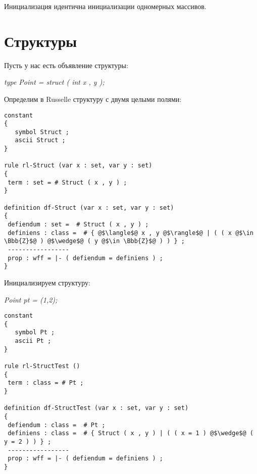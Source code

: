 \documentclass[10pt,a4paper]{article}
\begin{document}
Инициализация идентична инициализации одномерных массивов.
\section{Структуры}

Пусть у нас есть объявление структуры:
\begin{center}

\textit{type Point = struct ( int x , y );}
\end{center}
Определим в Russelle структуру с двумя целыми полями:
\begin{lstlisting}
constant
{
   symbol Struct ;
   ascii Struct ;
}

rule rl-Struct (var x : set, var y : set)
{
 term : set = # Struct ( x , y ) ;
}

definition df-Struct (var x : set, var y : set)
{
 defiendum : set =  # Struct ( x , y ) ;
 definiens : class =  # { @$\langle$@ x , y @$\rangle$@ | ( ( x @$\in \Bbb{Z}$@ ) @$\wedge$@ ( y @$\in \Bbb{Z}$@ ) ) } ;
 -----------------
 prop : wff = |- ( defiendum = definiens ) ;
}

\end{lstlisting}
Инициализируем структуру:
\begin{center}
\textit{Point pt = (1,2);}
\end{center}
\begin{lstlisting}
constant
{
   symbol Pt ;
   ascii Pt ;
}

rule rl-StructTest ()
{
 term : class = # Pt ;
}

definition df-StructTest (var x : set, var y : set)
{
 defiendum : class =  # Pt ;
 definiens : class =  # { Struct ( x , y ) | ( ( x = 1 ) @$\wedge$@ ( y = 2 ) ) } ;
 -----------------
 prop : wff = |- ( defiendum = definiens ) ;
}
\end{lstlisting}
\end{document}
